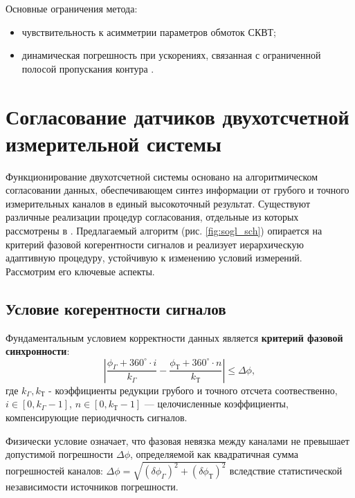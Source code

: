 Основные ограничения метода:
\begin{itemize}
    \item чувствительность к асимметрии параметров обмоток СКВТ; 
    \item динамическая погрешность при ускорениях, связанная с ограниченной полосой пропускания контура \cite{Anufriev2014}.
\end{itemize}



\section{Согласование датчиков двухотсчетной измерительной системы}
Функционирование двухотсчетной системы основано на алгоритмическом согласовании данных, обеспечивающем синтез информации 
от грубого и точного измерительных каналов в единый высокоточный результат. Существуют различные реализации процедур согласования, 
отдельные из которых рассмотрены в \cite{Sogl}. Предлагаемый алгоритм (рис. \ref{fig:sogl_sch}) опирается на критерий фазовой когерентности сигналов 
и реализует иерархическую адаптивную процедуру, устойчивую к изменению условий измерений. Рассмотрим его ключевые аспекты.


\subsection{Условие когерентности сигналов}
Фундаментальным условием корректности данных является \textbf{критерий фазовой синхронности}:
\begin{equation}
    \left| \frac{\phi_{\Gamma} + 360^{\circ} \cdot i}{k_{\Gamma}} - \frac{\phi_{\text{Т}} + 360^{\circ} \cdot n}{k_{\text{Т}}} \right| \leq \Delta\phi,
    \label{phaseSync}
\end{equation}
где $k_{\Gamma}, k_{\text{Т}}$ - коэффициенты редукции грубого и точного отсчета соотвественно, \newline $ i \in [0, k_{\Gamma}-1]$, $n \in [0, k_{\text{Т}}-1]$ — целочисленные 
коэффициенты, компенсирующие периодичность сигналов.
 
Физически условие означает, что фазовая невязка между каналами не превышает допустимой погрешности $\Delta\phi$, определяемой как квадратичная сумма 
 погрешностей каналов:  $\Delta\phi = \sqrt{(\delta\phi_{\Gamma})^2 + (\delta\phi_{\text{Т}})^2}$ вследствие статистической независимости источников погрешности.

